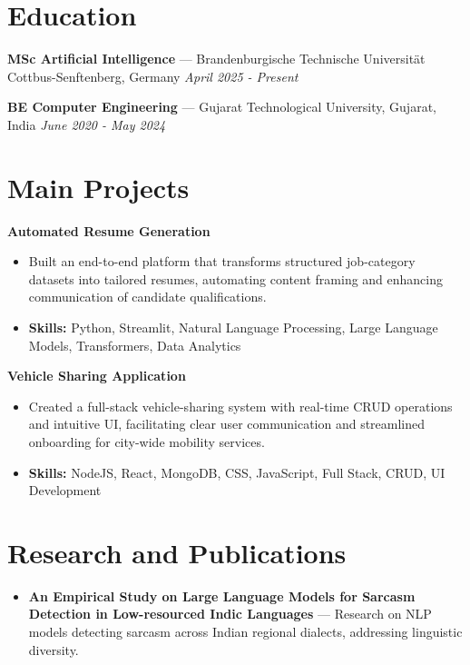 \documentclass[a4paper,10pt]{article}
\begin{document}
\section*{Education}
\textbf{MSc Artificial Intelligence} — Brandenburgische Technische Universität Cottbus-Senftenberg, Germany \hfill \textit{April 2025 - Present}\par
\vspace{1.5pt}
\textbf{BE Computer Engineering} — Gujarat Technological University, Gujarat, India \hfill \textit{June 2020 - May 2024}\par

\section*{Main Projects}
\textbf{Automated Resume Generation}\par
\vspace{1pt}
\begin{itemize}
  \item Built an end-to-end platform that transforms structured job-category datasets into tailored resumes, automating content framing and enhancing communication of candidate qualifications.
  \item \textbf{Skills:} Python, Streamlit, Natural Language Processing, Large Language Models, Transformers, Data Analytics
\end{itemize}
\vspace{3pt}
\textbf{Vehicle Sharing Application}\par
\vspace{1pt}
\begin{itemize}
  \item Created a full-stack vehicle-sharing system with real-time CRUD operations and intuitive UI, facilitating clear user communication and streamlined onboarding for city-wide mobility services.
  \item \textbf{Skills:} NodeJS, React, MongoDB, CSS, JavaScript, Full Stack, CRUD, UI Development
\end{itemize}

\section*{Research and Publications}
\begin{itemize}
\item \textbf{An Empirical Study on Large Language Models for Sarcasm Detection in Low-resourced Indic Languages} — Research on NLP models detecting sarcasm across Indian regional dialects, addressing linguistic diversity.
\end{itemize}
\end{document}
